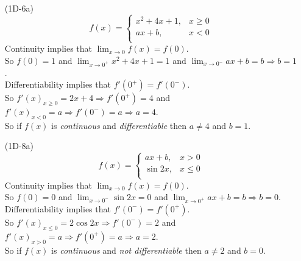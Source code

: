 \documentclass{article}
\begin{document}
\begin{itemize}
\item[(1D-6a)]
\[f(x)=
    \left\{
      \begin{array}{ll}
      x^2+4x+1, & x \geq 0 \\
      ax+b, & x < 0 \\
      \end{array} 
      \right.
    \]
Continuity implies that $\lim_{x \to 0} f(x) = f(0)$.\\
So $f(0) = 1$ and $\lim_{x \to 0^+} x^2+4x+1 = 1$ and  $\lim_{x \to 0^-} ax + b = b \Rightarrow b = 1$. \\ 
Differentiability implies that $f'(0^+) = f'(0^-)$. \\
So $f'(x)_{x \geq 0} = 2x+4 \Rightarrow f'(0^+) = 4$ and  $f'(x)_{x < 0} = a \Rightarrow f'(0^-) = a \Rightarrow a = 4$. \\
So if $f(x)$ is \emph{continuous} and \emph{differentiable} then $a \neq 4$ and $b = 1$.
    
\item[(1D-8a)]  
    \[f(x)=
    \left\{
      \begin{array}{ll}
      ax+b, & x > 0 \\
      \sin 2x, & x \leq 0 \\
      \end{array} 
      \right.
    \]
Continuity implies that $\lim_{x \to 0} f(x) = f(0)$.\\
So $f(0) = 0$ and $\lim_{x \to 0^-} \sin 2x = 0$ and  $\lim_{x \to 0^+} ax + b = b \Rightarrow b = 0$. \\ 
Differentiability implies that $f'(0^-) = f'(0^+)$. \\
So $f'(x)_{x \leq 0} = 2\cos 2x \Rightarrow f'(0^-) = 2$ and  $f'(x)_{x > 0} = a \Rightarrow f'(0^+) = a \Rightarrow a = 2$. \\
So if $f(x)$ is \emph{continuous} and \emph{not differentiable} then $a \neq 2$ and $b = 0$.
\end{itemize}
\end{document}
